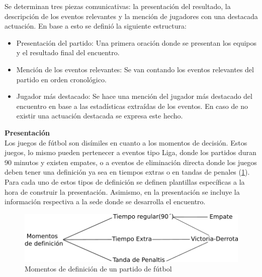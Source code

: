 
    Se determinan tres piezas comunicativas: la presentación del resultado, la descripción de los eventos relevantes y 
la mención de jugadores con una destacada actuación. En base a esto se definió la siguiente estructura:

\begin{itemize}
    \item Presentación del partido: Una primera oración donde se presentan los equipos y el resultado final del encuentro.
    \item Mención de los eventos relevantes: Se van contando los eventos relevantes del partido en orden cronol\'ogico.
    \item Jugador más destacado: Se hace una mención del jugador más destacado del encuentro en base a las estadísticas extraídas de los 
    eventos. En caso de no existir una actuación destacada se expresa este hecho.
\end{itemize}

\pagebreak

    \textbf{Presentación}\\

   Los juegos de fútbol son disímiles en cuanto a los momentos de decisión. Estos juegos, lo mismo pueden pertenecer a eventos tipo Liga, donde los partidos 
duran 90 minutos y existen empates, o a eventos de eliminación directa donde los juegos deben tener una definición ya sea en tiempos extras 
o en tandas de penales (\ref{fig_momentos_definicion}). Para cada uno de estos tipos de definición se definen plantillas específicas a la hora de construir 
la presentación. Asimismo, en la presentación se incluye la información respectiva a la sede donde se desarrolla el encuentro.\\

    \begin{figure}[!]
        \begin{center}
            \includegraphics[scale=1]{Graphics/momentodef.png}
        \end{center}
        \caption{Momentos de definición de un partido de fútbol}
        \label{fig_momentos_definicion}
    \end{figure}

